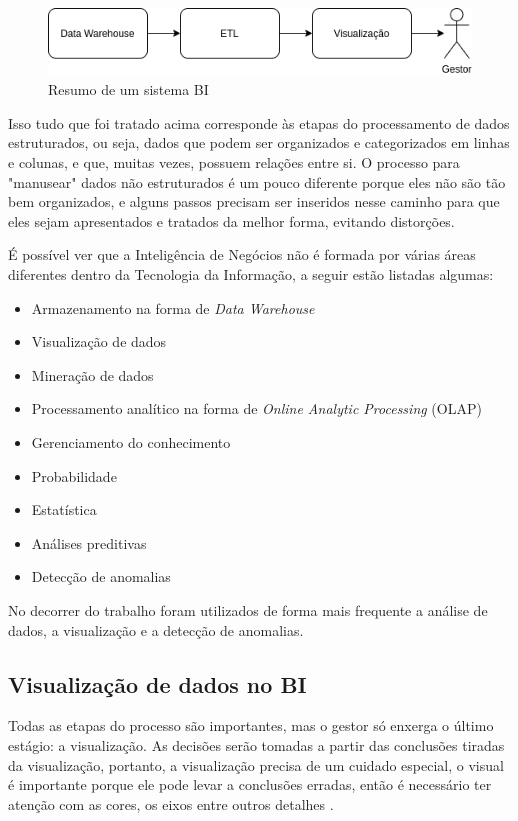\begin{figure}[h]
	\centering
	\includegraphics[scale=0.80]{./figures/cap1/resumo_bi.png}
	\caption{Resumo de um sistema BI}
\end{figure}

Isso tudo que foi tratado acima corresponde às etapas do processamento de dados estruturados, ou seja, dados que podem ser organizados e categorizados em linhas e colunas, e que, muitas vezes, possuem relações entre si. O processo para "manusear" dados não estruturados é um pouco diferente porque eles não são tão bem organizados, e alguns passos precisam ser inseridos nesse caminho para que eles sejam apresentados e tratados da melhor forma, evitando distorções.

É possível ver que a Inteligência de Negócios não é formada por várias áreas diferentes dentro da Tecnologia da Informação, a seguir estão listadas algumas:

\begin{itemize}
	\item Armazenamento na forma de \textit{Data Warehouse}
	\item Visualização de dados
	\item Mineração de dados
	\item Processamento analítico na forma de \textit{Online Analytic Processing} (OLAP)
	\item Gerenciamento do conhecimento
	\item Probabilidade
	\item Estatística
	\item Análises preditivas
	\item Detecção de anomalias
\end{itemize}

No decorrer do trabalho foram utilizados de forma mais frequente a análise de dados, a visualização e a detecção de anomalias.

\subsection{Visualização de dados no BI}

Todas as etapas do processo são importantes, mas o gestor só enxerga o último estágio: a visualização. As decisões serão tomadas a partir das conclusões tiradas da visualização, portanto, a visualização precisa de um cuidado especial, o visual é importante porque ele pode levar a conclusões erradas, então é necessário ter atenção com as cores, os eixos entre outros detalhes \cite{claus1}.

